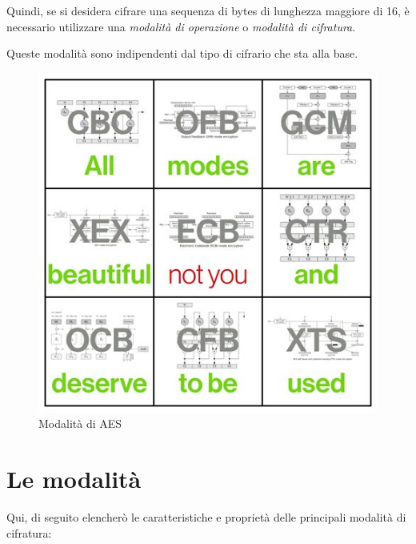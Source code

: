 \textsf{\small Quindi, se si desidera cifrare una sequenza di bytes di lunghezza maggiore di 16, è necessario utilizzare una \emph{modalità di operazione} o \emph{modalità di cifratura}.} %

\textsf{\small Queste modalità sono indipendenti dal tipo di cifrario che sta alla base.} %

\begin{figure}[H]
	\centering
	\includegraphics[width=.8\textwidth, height=.8\textheight, keepaspectratio]{./images/aes_modes/modes.png} %
	\caption{Modalità di AES}
	\label{fig:aes_modes}
\end{figure}


\section{Le modalità} %

\textsf{\small Qui, di seguito elencherò le caratteristiche e proprietà delle principali modalità di cifratura:}


